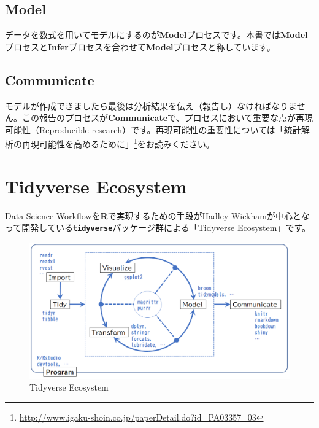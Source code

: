 \documentclass[
  12pt,
]{book}
\DeclareRobustCommand{\href}[2]{#2\footnote{\url{#1}}}
\begin{document}
\hypertarget{model}{%
\subsection*{Model}\label{model}}

データを数式を用いてモデルにするのが\textbf{Model}プロセスです。本書では\textbf{Model}プロセスと\textbf{Infer}プロセスを合わせて\textbf{Model}プロセスと称しています。

\hypertarget{communicate}{%
\subsection*{Communicate}\label{communicate}}

モデルが作成できましたら最後は分析結果を伝え（報告し）なければなりません。この報告のプロセスが\textbf{Communicate}で、プロセスにおいて重要な点が再現可能性（Reproducible research）です。再現可能性の重要性については\href{http://www.igaku-shoin.co.jp/paperDetail.do?id=PA03357_03}{「統計解析の再現可能性を高めるために」}をお読みください。

\hypertarget{tidyverse-ecosystem}{%
\section*{Tidyverse Ecosystem}\label{tidyverse-ecosystem}}

Data Science Workflowを\textbf{R}で実現するための手段がHadley Wickhamが中心となって開発している\textbf{\texttt{tidyverse}}パッケージ群による「Tidyverse Ecosystem」です。

\begin{figure}[H]

{\centering \includegraphics[width=0.85\linewidth,]{./fig/DSWF/tidyverse_eco_system} 

}

\caption{Tidyverse Ecosystem}\label{fig:unnamed-chunk-14}
\end{figure}
\end{document}
